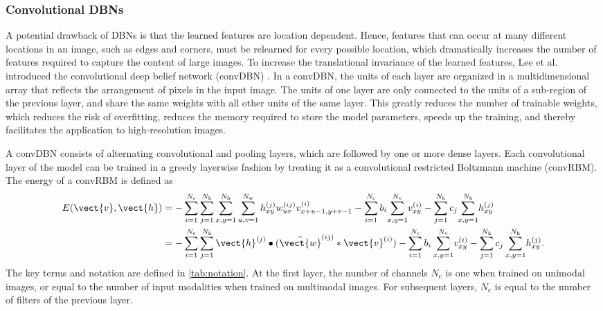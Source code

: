 \subsubsection{Convolutional DBNs}

A potential drawback of DBNs is that the learned features are location
dependent. Hence, features that can occur at many different locations in an
image, such as edges and corners, must be relearned for every possible location,
which dramatically increases the number of features required to capture the
content of large images. To increase the translational invariance of the learned
features, Lee et al. introduced the convolutional deep belief network (convDBN)
\citep{lee2009,lee2011}. In a convDBN, the units of each layer are organized in
a multidimensional array that reflects the arrangement of pixels in the input
image. The units of one layer are only connected to the units of a sub-region of
the previous layer, and share the same weights with all other units of the same
layer. This greatly reduces the number of trainable weights, which reduces the
risk of overfitting, reduces the memory required to store the model parameters,
speeds up the training, and thereby facilitates the application to
high-resolution images.

A convDBN consists of alternating convolutional and pooling layers, which are
followed by one or more dense layers. Each convolutional layer of the model can
be trained in a greedy layerwise fashion by treating it as a convolutional
restricted Boltzmann machine (convRBM). The energy of a convRBM is defined as
\begin{align} 
E(\vect{v},\vect{h}) 
&= -\sum_{i=1}^{N_\text{c}} \sum_{j=1}^{N_\text{k}}
\sum_{x,y=1}^{N_\text{h}} \sum_{u,v=1}^{N_\text{w}}
h_{xy}^{(j)}w_{uv}^{(ij)}v_{x+u-1, y+v-1}^{(i)} -
\sum_{i=1}^{N_\text{c}}b_i\!\sum_{x,y = 1}^{N_\text{v}}\!v_{xy}^{(i)} -
\sum_{j=1}^{N_\text{k}}c_j\!\sum_{x,y = 1}^{N_\text{h}}\!h_{xy}^{(j)} \\
&= -\sum_{i=1}^{N_\text{c}} \sum_{j=1}^{N_\text{k}} \vect{h}^{(j)}
\bullet (\tilde{\vect{w}}^{(ij)} * \vect{v}^{(i)}) -
\sum_{i=1}^{N_\text{c}}b_i\sum_{x,y = 1}^{N_\text{v}}\!v_{xy}^{(i)} -
\sum_{j=1}^{N_\text{k}}c_j\sum_{x,y = 1}^{N_\text{h}}\!h_{xy}^{(j)}.
\end{align}
The key terms and notation are defined in \ref{tab:notation}. At the first
layer, the number of channels $N_\text{c}$ is
one when trained on unimodal images, or equal to the number of input
modalities when trained on multimodal images. For subsequent layers,
$N_\text{c}$ is equal to the number of filters of the previous layer.


